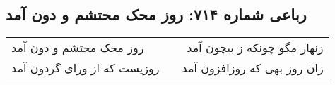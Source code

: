 \begin{center}
\section*{رباعی شماره ۷۱۴: روز محک محتشم و دون آمد}
\label{sec:0714}
\begin{longtable}{l p{0.5cm} r}
روز محک محتشم و دون آمد
&&
زنهار مگو چونکه ز بیچون آمد
\\
روزیست که از ورای گردون آمد
&&
زان روز بهی که روزافزون آمد
\\
\end{longtable}
\end{center}
